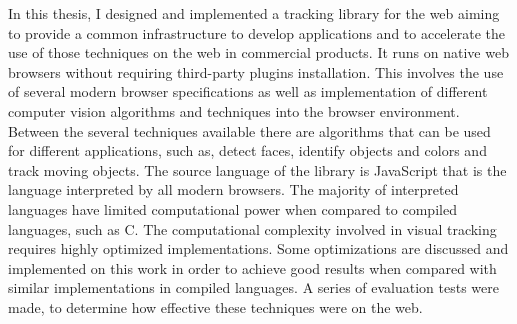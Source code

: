 In this thesis, I designed and implemented a tracking library for the web aiming to provide a common infrastructure to develop applications and to accelerate the use of those techniques on the web in commercial products. It runs on native web browsers without requiring third-party plugins installation. This involves the use of several modern browser specifications as well as implementation of different computer vision algorithms and techniques into the browser environment. Between the several techniques available there are algorithms that can be used for different applications, such as, detect faces, identify objects and colors and track moving objects. The source language of the library is JavaScript that is the language interpreted by all modern browsers. The majority of interpreted languages have limited computational power when compared to compiled languages, such as C. The computational complexity involved in visual tracking requires highly optimized implementations. Some optimizations are discussed and implemented on this work in order to achieve good results when compared with similar implementations in compiled languages. A series of evaluation tests were made, to determine how effective these techniques were on the web.


